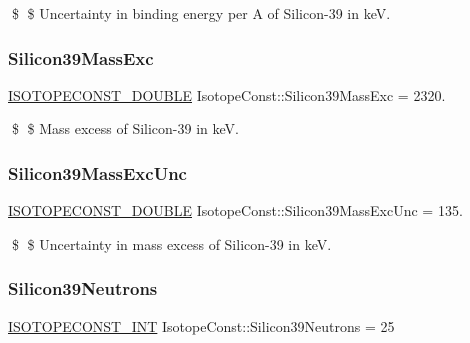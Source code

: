 \$ \$ Uncertainty in binding energy per A of Silicon-\/39 in keV. \mbox{\label{group___isotope_const-_silicon-_si39_ga870435698c6b2d4f3957bf1df76cb33a}} 
\subsubsection{\texorpdfstring{Silicon39\+Mass\+Exc}{Silicon39MassExc}}
{\footnotesize\ttfamily \mbox{\hyperlink{group___isotope_const-_macros_ga8f45a7272ce02c0b4c65c44636ed719a}{I\+S\+O\+T\+O\+P\+E\+C\+O\+N\+S\+T\+\_\+\+D\+O\+U\+B\+LE}} Isotope\+Const\+::\+Silicon39\+Mass\+Exc = 2320.}

\$ \$ Mass excess of Silicon-\/39 in keV. \mbox{\label{group___isotope_const-_silicon-_si39_gaa8c67bc898a70ed23c4b12f6cff3d03f}} 
\subsubsection{\texorpdfstring{Silicon39\+Mass\+Exc\+Unc}{Silicon39MassExcUnc}}
{\footnotesize\ttfamily \mbox{\hyperlink{group___isotope_const-_macros_ga8f45a7272ce02c0b4c65c44636ed719a}{I\+S\+O\+T\+O\+P\+E\+C\+O\+N\+S\+T\+\_\+\+D\+O\+U\+B\+LE}} Isotope\+Const\+::\+Silicon39\+Mass\+Exc\+Unc = 135.}

\$ \$ Uncertainty in mass excess of Silicon-\/39 in keV. \mbox{\label{group___isotope_const-_silicon-_si39_gad332cbdb98b51e9ce72272c3daa4760b}} 
\subsubsection{\texorpdfstring{Silicon39\+Neutrons}{Silicon39Neutrons}}
{\footnotesize\ttfamily \mbox{\hyperlink{group___isotope_const-_macros_ga5f18360b3e99483a35c32d789e62621c}{I\+S\+O\+T\+O\+P\+E\+C\+O\+N\+S\+T\+\_\+\+I\+NT}} Isotope\+Const\+::\+Silicon39\+Neutrons = 25}

